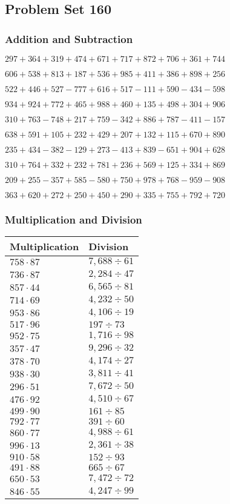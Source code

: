 \hypertarget{problem-set-160}{%
\subsection{Problem Set 160}\label{problem-set-160}}

\hypertarget{addition-and-subtraction}{%
\subsubsection{Addition and
Subtraction}\label{addition-and-subtraction}}

\(297 +364 +319 +474 +671 +717 +872 +706 +361 +744\)

\(606 +538 +813 +187 +536 +985 +411 +386 +898 +256\)

\(522 +446 +527 - 777 +616 +517 - 111 +590 - 434 - 598\)

\(934 +924 +772 +465 +988 +460 +135 +498 +304 +906\)

\(310 +763 - 748 +217 +759 - 342 +886 +787 - 411 - 157\)

\(638 +591 +105 +232 +429 +207 +132 +115 +670 +890\)

\(235 +434 - 382 - 129 +273 - 413 +839 - 651 +904 +628\)

\(310 +764 +332 +232 +781 +236 +569 +125 +334 +869\)

\(209 +255 - 357 +585 - 580 +750 +978 +768 - 959 - 908\)

\(363 +620 +272 +250 +450 +290 +335 +755 +792 +720\)

\hypertarget{multiplication-and-division}{%
\subsubsection{Multiplication and
Division}\label{multiplication-and-division}}

\begin{longtable}[]{@{}ll@{}}
\toprule
Multiplication & Division\tabularnewline
\midrule
\endhead
\(758 \cdot 87\) & \(7,688÷61\)\tabularnewline
\(736 \cdot 87\) & \(2,284÷47\)\tabularnewline
\(857 \cdot 44\) & \(6,565÷81\)\tabularnewline
\(714 \cdot 69\) & \(4,232÷50\)\tabularnewline
\(953 \cdot 86\) & \(4,106÷19\)\tabularnewline
\(517 \cdot 96\) & \(197÷73\)\tabularnewline
\(952 \cdot 75\) & \(1,716÷98\)\tabularnewline
\(357 \cdot 47\) & \(9,296÷32\)\tabularnewline
\(378 \cdot 70\) & \(4,174÷27\)\tabularnewline
\(938 \cdot 30\) & \(3,811÷41\)\tabularnewline
\(296 \cdot 51\) & \(7,672÷50\)\tabularnewline
\(476 \cdot 92\) & \(4,510÷67\)\tabularnewline
\(499 \cdot 90\) & \(161÷85\)\tabularnewline
\(792 \cdot 77\) & \(391÷60\)\tabularnewline
\(860 \cdot 77\) & \(4,988÷61\)\tabularnewline
\(996 \cdot 13\) & \(2,361÷38\)\tabularnewline
\(910 \cdot 58\) & \(152÷93\)\tabularnewline
\(491 \cdot 88\) & \(665÷67\)\tabularnewline
\(650 \cdot 53\) & \(7,472÷72\)\tabularnewline
\(846 \cdot 55\) & \(4,247÷99\)\tabularnewline
\bottomrule
\end{longtable}
